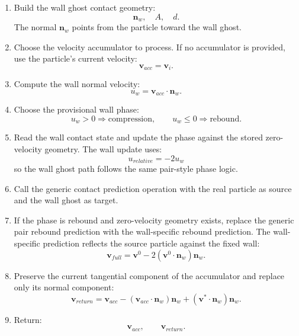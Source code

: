 \begin{enumerate}
    \item Build the wall ghost contact geometry:
    \[
        \mathbf{n}_{w},\quad A,\quad d.
    \]
    The normal \(\mathbf{n}_{w}\) points from the particle toward the wall
    ghost.

    \item Choose the velocity accumulator to process. If no accumulator is
    provided, use the particle's current velocity:
    \[
        \mathbf{v}_{acc} = \mathbf{v}_i .
    \]

    \item Compute the wall normal velocity:
    \[
        u_w
        =
        \mathbf{v}_{acc}
        \cdot
        \mathbf{n}_{w}.
    \]

    \item Choose the provisional wall phase:
    \[
        u_w > 0 \Rightarrow \text{compression},
        \qquad
        u_w \le 0 \Rightarrow \text{rebound}.
    \]

    \item Read the wall contact state and update the phase against the stored
    zero-velocity geometry. The wall update uses:
    \[
        u_{relative} = -2u_w
    \]
    so the wall ghost path follows the same pair-style phase logic.

    \item Call the generic contact prediction operation with the real particle
    as source and the wall ghost as target.

    \item If the phase is rebound and zero-velocity geometry exists, replace
    the generic pair rebound prediction with the wall-specific rebound
    prediction. The wall-specific prediction reflects the source particle
    against the fixed wall:
    \[
        \mathbf{v}_{full}
        =
        \mathbf{v}^{0}
        -
        2
        \left(
            \mathbf{v}^{0}\cdot\mathbf{n}_{w}
        \right)
        \mathbf{n}_{w}.
    \]

    \item Preserve the current tangential component of the accumulator and
    replace only its normal component:
    \[
        \mathbf{v}_{return}
        =
        \mathbf{v}_{acc}
        -
        \left(
            \mathbf{v}_{acc}\cdot\mathbf{n}_{w}
        \right)
        \mathbf{n}_{w}
        +
        \left(
            \mathbf{v}^{\ast}\cdot\mathbf{n}_{w}
        \right)
        \mathbf{n}_{w}.
    \]

    \item Return:
    \[
        \mathbf{v}_{acc},
        \qquad
        \mathbf{v}_{return}.
    \]
\end{enumerate}

